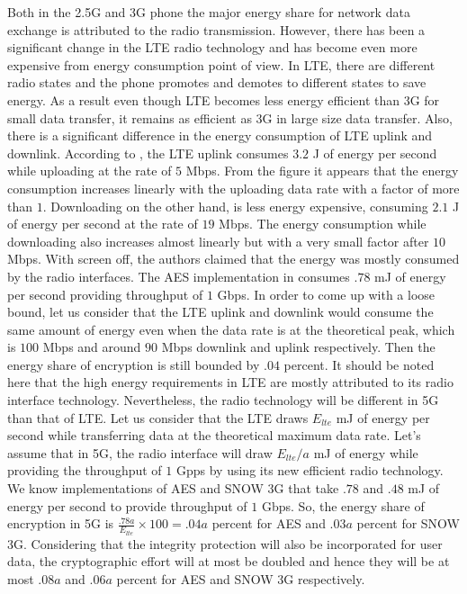 \documentclass[12pt]{llncs}
\begin{document}
Both in the 2.5G and 3G phone the major energy share for network data exchange is attributed to the radio transmission. However, there has been a significant change in the LTE radio technology and has become even more expensive from energy consumption point of view. In LTE, there are different radio states and the phone promotes and demotes to different states to save energy. As a result even though LTE becomes less energy efficient than 3G for small data transfer, it remains as efficient as 3G in large size data transfer. Also, there is a significant difference in the energy consumption of LTE uplink and downlink. According to \cite[Fig 9]{Mobisys_2012}, the LTE uplink consumes $3.2$ J of energy per second while uploading at the rate of $5$ Mbps. From the figure it appears that the energy consumption increases linearly with the uploading data rate with a factor of more than $1$. Downloading on the other hand, is less energy expensive, consuming $2.1$ J of energy per second at the rate of $19$ Mbps. The energy consumption while downloading also increases almost linearly but with a very small factor after $10$ Mbps. With screen off, the authors claimed that the energy was mostly consumed by the radio interfaces. The AES implementation in \cite{Ruhr_2011} consumes $.78$ mJ of energy per second providing throughput of $1$ Gbps. In order to come up with a loose bound, let us consider that the LTE uplink and downlink would consume the same amount of energy even when the data rate is at the theoretical peak, which is $100$ Mbps and around $90$ Mbps downlink and uplink respectively. Then the energy share of encryption is still bounded by $.04$ percent. It should be noted here that the high energy requirements in LTE are mostly attributed to its radio interface technology. Nevertheless, the radio technology will be different in 5G than that of LTE. Let us consider that the LTE draws $E_{lte}$ mJ of energy per second while transferring data at the theoretical maximum data rate. Let's assume that in 5G, the radio interface will draw $E_{lte}/a$ mJ of energy while providing the throughput of $1$ Gpps by using its new efficient radio technology. We know implementations of AES and SNOW 3G that take $.78$ and $.48$ mJ of energy per second to provide throughput of $1$ Gbps. So, the energy share of encryption in 5G is $\frac{.78a}{E_{lte}}\times 100 = .04a$ percent for AES and $.03a$ percent for SNOW 3G. Considering that the integrity protection will also be incorporated for user data, the cryptographic effort will at most be doubled and hence they will be at most $.08a$ and $.06a$ percent for AES and SNOW 3G respectively. 
\end{document}
